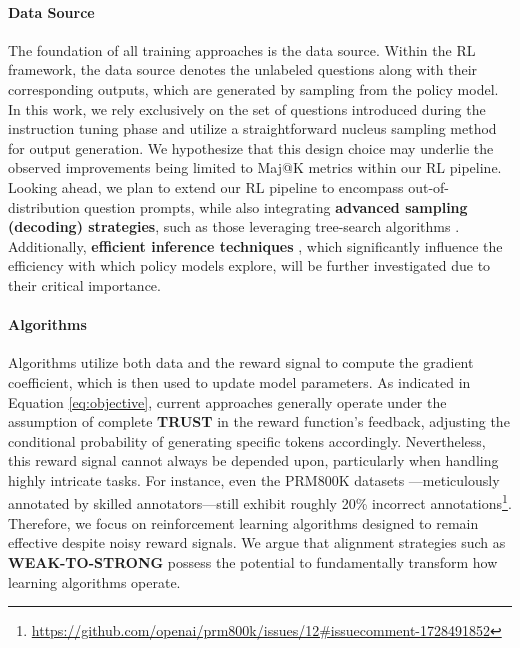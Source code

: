 \paragraph{Data Source} The foundation of all training approaches is the data source. Within the RL framework, the data source denotes the unlabeled questions along with their corresponding outputs, which are generated by sampling from the policy model. In this work, we rely exclusively on the set of questions introduced during the instruction tuning phase and utilize a straightforward nucleus sampling method for output generation. We hypothesize that this design choice may underlie the observed improvements being limited to Maj@K metrics within our RL pipeline. Looking ahead, we plan to extend our RL pipeline to encompass out-of-distribution question prompts, while also integrating \textbf{advanced sampling (decoding) strategies}, such as those leveraging tree-search algorithms \citep{yao2023tree}. Additionally, \textbf{efficient inference techniques} \citep{xia-etal-2023-speculative,leviathan2023fast,kwon2023efficient,xia2024unlocking}, which significantly influence the efficiency with which policy models explore, will be further investigated due to their critical importance.

\paragraph{Algorithms} Algorithms utilize both data and the reward signal to compute the gradient coefficient, which is then used to update model parameters. As indicated in Equation \ref{eq:objective}, current approaches generally operate under the assumption of complete \textbf{TRUST} in the reward function's feedback, adjusting the conditional probability of generating specific tokens accordingly. Nevertheless, this reward signal cannot always be depended upon, particularly when handling highly intricate tasks. For instance, even the PRM800K datasets \citep{lightman2023let}—meticulously annotated by skilled annotators—still exhibit roughly 20\% incorrect annotations\footnote{\url{https://github.com/openai/prm800k/issues/12\#issuecomment-1728491852}}. Therefore, we focus on reinforcement learning algorithms designed to remain effective despite noisy reward signals. We argue that alignment strategies such as \textbf{WEAK-TO-STRONG} \citep{burns2023weak} possess the potential to fundamentally transform how learning algorithms operate.

